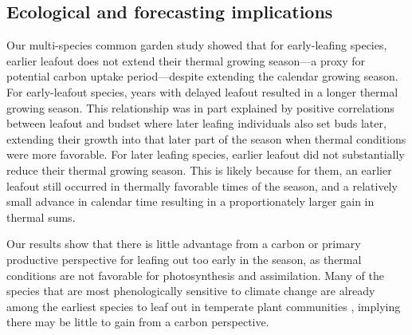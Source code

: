 \documentclass{article}[12pt]
\begin{document}
\subsection{Ecological and forecasting implications}
Our multi-species common garden study showed that for early-leafing species, earlier leafout does not extend their thermal growing season---a proxy for potential carbon uptake period---despite extending the calendar growing season. For early-leafout species, years with delayed leafout resulted in a longer thermal growing season. This relationship was in part explained by positive correlations between leafout and budset where later leafing individuals also set buds later, extending their growth into that later part of the season when thermal conditions were more favorable.  For later leafing species, earlier leafout did not substantially reduce their thermal growing season. This is likely because for them, an earlier leafout still occurred in thermally favorable times of the season, and a relatively small advance in calendar time resulting in a proportionately larger gain in thermal sums.

Our results show that there is little advantage from a carbon or primary productive perspective for leafing out too early in the season, as thermal conditions are not favorable for photosynthesis and assimilation. Many of the species that are most phenologically sensitive to climate change are already among the earliest species to leaf out in temperate plant communities \citep{Shen2014,Geng2020}, implying there may be little to gain from a carbon perspective.
\end{document}
